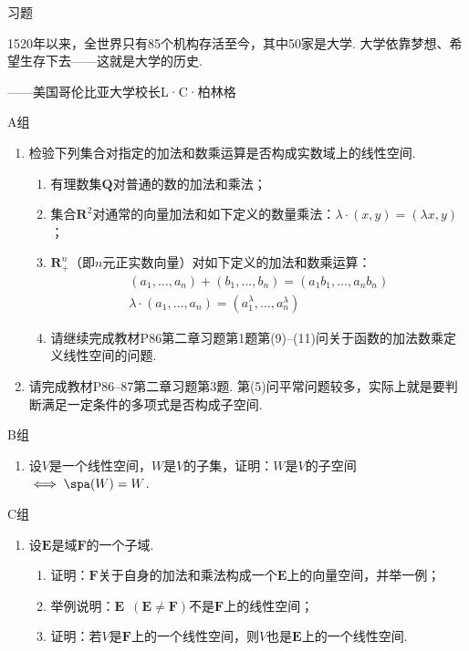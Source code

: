 \vspace{2ex}
\centerline{\heiti \Large 习题}

\vspace{2ex}
{\kaishu 1520年以来，全世界只有85个机构存活至今，其中50家是大学. 大学依靠梦想、希望生存下去——这就是大学的历史.}
\begin{flushright}
    \kaishu
    ——美国哥伦比亚大学校长L·C·柏林格
\end{flushright}

\centerline{\heiti A组}
\begin{enumerate}
    \item 检验下列集合对指定的加法和数乘运算是否构成实数域上的线性空间.
          \begin{enumerate}
              \item 有理数集$\mathbf{Q}$对普通的数的加法和乘法；

              \item 集合$\mathbf{R}^2$对通常的向量加法和如下定义的数量乘法：$\lambda\cdot(x,y)=(\lambda x,y)$；

              \item $\mathbf{R}_+^n$（即$n$元正实数向量）对如下定义的加法和数乘运算：
                    \begin{gather*}
                        (a_1,\ldots,a_n)+(b_1,\ldots,b_n)=(a_1b_1,\ldots,a_nb_n) \\
                        \lambda\cdot(a_1,\ldots,a_n)=(a_1^\lambda,\ldots,a_n^\lambda)
                    \end{gather*}

              \item 请继续完成教材P86第二章习题第1题第(9)--(11)问关于函数的加法数乘定义线性空间的问题.
          \end{enumerate}

    \item 请完成教材P86--87第二章习题第3题. 第(5)问平常问题较多，实际上就是要判断满足一定条件的多项式是否构成子空间.
\end{enumerate}

\centerline{\heiti B组}
\begin{enumerate}
    \item 设$V$是一个线性空间，$W$是$V$的子集，证明：$W$是$V$的子空间$\iff \spa(W)=W$.
\end{enumerate}

\centerline{\heiti C组}
\begin{enumerate}
    \item 设$\mathbf{E}$是域$\mathbf{F}$的一个子域.
          \begin{enumerate}
              \item 证明：$\mathbf{F}$关于自身的加法和乘法构成一个$\mathbf{E}$上的向量空间，并举一例；

              \item 举例说明：$\mathbf{E}\enspace(\mathbf{E}\neq \mathbf{F})$不是$\mathbf{F}$上的线性空间；

              \item 证明：若$V$是$\mathbf{F}$上的一个线性空间，则$V$也是$\mathbf{E}$上的一个线性空间.
          \end{enumerate}
\end{enumerate}
